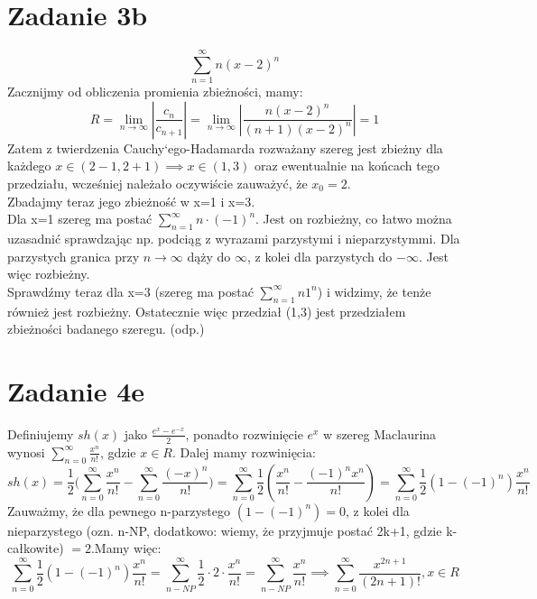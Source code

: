 \documentclass{article}
\begin{document}

\section*{Zadanie 3b}
$$\sum_{n=1}^{\infty} n(x-2)^n$$
Zacznijmy od obliczenia promienia zbieżności, mamy:
$$R = \lim_{n \to \infty} |\frac{c_n}{c_{n+1}}| = \lim_{n \to \infty} |\frac{n(x-2)^n}{(n+1)(x-2)^n}| = 1$$
Zatem z twierdzenia Cauchy`ego-Hadamarda rozważany szereg jest zbieżny dla każdego $x \in (2-1,2+1) \implies x \in (1,3)$ oraz ewentualnie na końcach tego przedziału, wcześniej należało oczywiście zauważyć, że $x_0 = 2$. \\
Zbadajmy teraz jego zbieżność w x=1 i x=3.\\
Dla x=1 szereg ma postać $\sum_{n=1}^{\infty} n \cdot (-1)^n$. Jest on rozbieżny, co łatwo można uzasadnić sprawdzając np. podciąg z wyrazami parzystymi i nieparzystymmi. Dla parzystych granica przy $n \to \infty$ dąży do $\infty$, z kolei dla parzystych do $-\infty$. Jest więc rozbieżny.\\ Sprawdźmy teraz dla x=3 (szereg ma postać $\sum_{n=1}^{\infty} n 1^n$) i widzimy, że tenże również jest rozbieżny.
Ostatecznie więc przedział (1,3) jest przedziałem zbieżności badanego szeregu. (odp.)


\section*{Zadanie 4e}
Definiujemy $sh(x)$ jako $\frac{e^x - e^{-x}}{2}$, ponadto rozwinięcie $e^x$ w szereg Maclaurina wynosi $\sum_{n=0}^{\infty} \frac{x^n}{n!}$, gdzie $x \in R$. Dalej mamy rozwinięcia:
$$sh(x) = \frac{1}{2} \Big(\sum_{n=0}^{\infty} \frac{x^n}{n!} - \sum_{n=0}^{\infty} \frac{(-x)^n}{n!}\Big) = \sum_{n=0}^{\infty} \frac{1}{2} (\frac{x^n}{n!} - \frac{(-1)^n x^n}{n!}) = \sum_{n=0}^{\infty} \frac{1}{2}(1-(-1)^n)\frac{x^n}{n!}$$
Zauważmy, że dla pewnego n-parzystego $(1-(-1)^n) = 0$, z kolei dla nieparzystego (ozn. n-NP, dodatkowo: wiemy, że przyjmuje postać 2k+1, gdzie k-całkowite) $= 2$.Mamy więc:
$$\sum_{n=0}^{\infty} \frac{1}{2}(1-(-1)^n)\frac{x^n}{n!} = \sum_{n-NP}^{\infty} \frac{1}{2} \cdot 2 \cdot \frac{x^n}{n!} = \sum_{n-NP}^{\infty} \frac{x^n}{n!} \implies \sum_{n=0}^{\infty} \frac{x^{2n+1}}{(2n+1)!}, x \in R$$
\end{document}
